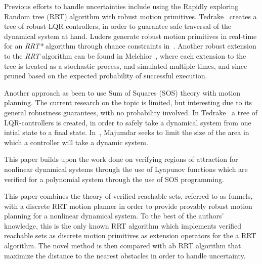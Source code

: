 Previous efforts to handle uncertainties include using
the Rapidly exploring Random tree (RRT) algorithm with robust motion
primitives. Tedrake~\cite{tedrakeLQRtreesFeedbackMotion2009} creates a tree of
robust LQR controllers, in order to guarantee safe traversal of the dynamical
system at hand. Luders generate robust motion primitives in real-time for an
\textit{RRT*} algorithm through chance constraints in~\cite{luders2013robust}.
Another robust extension to the \textit{RRT} algorithm can be found in
Melchior~\cite{melchior2007particle}, where each extension to the tree is
treated as a stochastic process, and simulated multiple times, and since pruned
based on the expected probability of successful execution.



Another approach as been to use 
Sum of Squares (SOS) theory with motion
planning. The current research on the topic is limited, but interesting due to its general robustness
guarantees, with no probability involved. In
Tedrake~\cite{tedrakeLQRtreesFeedbackMotion2009} a tree of LQR-controllers is
created, in order to safely take a dynamical system from one intial state to a
final state. In~\cite{majumdarFunnelLibrariesRealtime2017}, Majumdar seeks to
limit the size of the area in which a controller will take a dynamic system.


This paper builds upon the work done on verifying regions of attraction for
nonlinear dynamical systems through the use of Lyapunov functions which are
verified for a polynomial system through the use of SOS programming.


This paper combines the theory of verified reachable sets, referred to as
funnels, with a discrete RRT motion planner in order to provide provably robust
motion planning for a nonlinear dynamical system. To the best of the authors'
knowledge, this is the only known RRT algorithm which implements verified
reachable sets as discrete motion primitives as extension operators for the a
RRT algorithm. The novel method is then compared with ab RRT algorithm that maximize the distance to the nearest obstacles in order to handle uncertainty.

